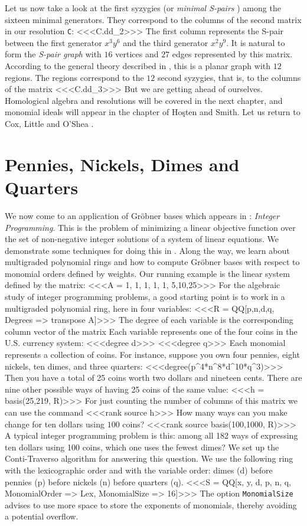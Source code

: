 Let us now take a look at the first syzygies 
(or {\it minimal S-pairs} \cite[\S 2.9]{CLO1})
among  the sixteen minimal generators.
They correspond to the columns of the second matrix in our resolution {\tt C}:
<<<C.dd_2>>>
The first column represents the S-pair between the
first generator $x^3 y^6 $ and the third generator $x^2 y^9$.
It is natural to form the {\it S-pair graph} with $16$ vertices and
$27$ edges represented by  this matrix. According to the
general theory described in \cite{MS}, this is a planar graph
with $12$ regions. The regions correspond to the $12$ second syzygies,
that is, to the columns of the matrix
<<<C.dd_3>>>
But we are getting ahead of ourselves. Homological algebra and resolutions
will be covered in the next chapter, and monomial ideals
will appear in the chapter of Ho\c{s}ten and Smith.
Let us return to Cox, Little and O'Shea \cite{CLO2}.

\section{Pennies, Nickels, Dimes and Quarters}

We now come to an application of Gr\"obner bases which appears in
\cite[Section 8.1]{CLO2}: {\sl Integer Programming}. This is the problem of
 minimizing a linear objective function over the set of non-negative 
integer solutions of a system of linear equations.  We demonstrate
some techniques for doing this in \Mtwo. Along the way, we learn about
multigraded polynomial rings and how to compute
Gr\"obner bases with respect to monomial orders defined by weights.
Our running example is the linear system defined  by the matrix:
<<<A = {{1, 1, 1, 1},
     {1, 5,10,25}}>>>
For the algebraic study of integer programming problems, a good starting
point is to work in a multigraded polynomial ring, here in four variables:
<<<R = QQ[p,n,d,q, Degrees => transpose A]>>>
The degree of each variable is the corresponding column vector of the matrix
Each variable represents one of the four coins in the U.S. currency system:
<<<degree d>>>
<<<degree q>>>
Each monomial represents a collection of coins. For instance, suppose
you own four  pennies, eight nickels, ten dimes, and three quarters:
<<<degree(p^4*n^8*d^10*q^3)>>>
Then you have a total of 25 coins worth two dollars and nineteen cents.
There are nine other possible ways of having 25 coins of the same value:
<<<h = basis({25,219}, R)>>>
For just counting the number of columns of this matrix
we can use the command
<<<rank source h>>>
How many ways can you make change for ten dollars using $100$ coins?
<<<rank source basis({100,1000}, R)>>>
A typical integer programming problem is this: among all 182 ways of
expressing ten dollars using 100 coins, which one uses the fewest dimes?
We set up the  Conti-Traverso algorithm \cite[\S 8.1]{CLO2} for 
answering this question. We use the following ring with the lexicographic
order and with the variable order:
dimes (d) before pennies (p) before nickels (n) before quarters (q).
<<<S = QQ[x, y, d, p, n, q, 
    MonomialOrder => Lex, MonomialSize => 16]>>>
The option {\tt MonomialSize} advises \Mtwo to use more space to store the
exponents of monomials, thereby avoiding a potential overflow.

